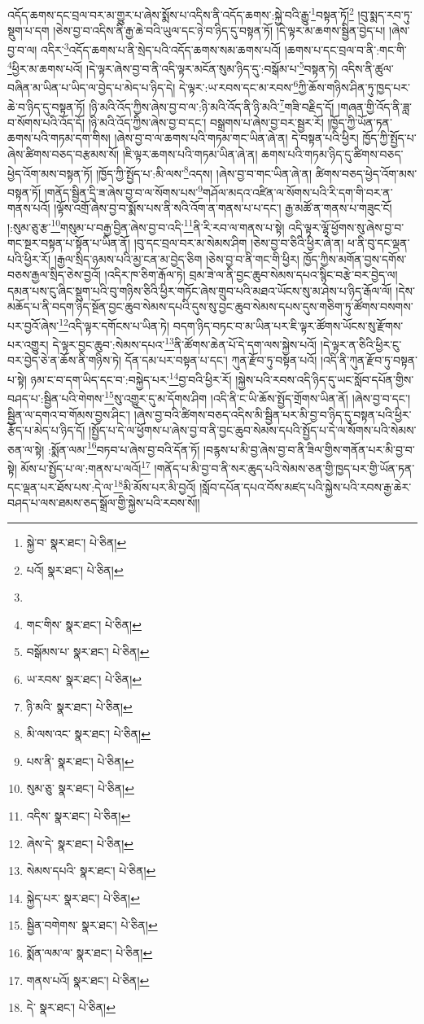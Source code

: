 འདོད་ཆགས་དང་བྲལ་བར་མ་གྱུར་པ་ཞེས་སྨོས་པ་འདིས་ནི་འདོད་ཆགས་:སྐྱེ་བའི་རྒྱུ་\footnote{སྐྱེ་བ་  སྣར་ཐང་།  པེ་ཅིན། }བསྟན་ཏོ།\footnote{པའོ།  སྣར་ཐང་།  པེ་ཅིན། } །བུ་སྨད་རབ་ཏུ་སྡུག་པ་དག །ཅེས་བྱ་བ་འདིས་ནི་རྒྱ་ཆེ་བའི་ཡུལ་དང་ཉེ་བ་ཉིད་དུ་བསྟན་ཏོ། །དེ་ལྟར་མ་ཆགས་སྦྱིན་བྱེད་པ། །ཞེས་བྱ་བ་ལ། འདིར་\footnote{}འདོད་ཆགས་པ་ནི་སྲེད་པའི་འདོད་ཆགས་སམ་ཆགས་པའོ། །ཆགས་པ་དང་བྲལ་བ་ནི་:གང་གི་\footnote{གང་གིས་  སྣར་ཐང་།  པེ་ཅིན། }ཕྱིར་མ་ཆགས་པའོ། །དེ་ལྟར་ཞེས་བྱ་བ་ནི་འདི་ལྟར་མངོན་སུམ་ཉིད་དུ་:བསྒོམ་པ་\footnote{བསྒོམས་པ་  སྣར་ཐང་།  པེ་ཅིན། }བསྟན་ཏེ། འདིས་ནི་ཚུལ་བཞིན་མ་ཡིན་པ་ཡིད་ལ་བྱེད་པ་མེད་པ་ཉིད་དེ། དེ་ལྟར་:ཡ་རབས་དང་མ་རབས་\footnote{ཡ་རབས་  སྣར་ཐང་།  པེ་ཅིན། }ཀྱི་ཆོས་གཉིས་ཤིན་ཏུ་ཁྱད་པར་ཆེ་བ་ཉིད་དུ་བསྟན་ཏོ། །ཉི་མའི་འོད་ཀྱིས་ཞེས་བྱ་བ་ལ་:ཉི་མའི་འོད་ནི་ཉི་མའི་\footnote{ཉི་མའི་  སྣར་ཐང་།  པེ་ཅིན། }གཟི་བརྗིད་དོ། །གཞན་གྱི་འོད་ནི་ཟླ་བ་སོགས་པའི་འོད་དོ། །ཉི་མའི་འོད་ཀྱིས་ཞེས་བྱ་བ་དང་། བསྒྲགས་པ་ཞེས་བྱ་བར་སྦྱར་རོ། །ཁྱོད་ཀྱི་ཡོན་ཏན་ཆགས་པའི་གཏམ་དག་གིས། །ཞེས་བྱ་བ་ལ་ཆགས་པའི་གཏམ་གང་ཡིན་ཞེ་ན། དེ་བསྟན་པའི་ཕྱིར། ཁྱོད་ཀྱི་སྤྱོད་པ་ཞེས་ཚིགས་བཅད་བརྩམས་སོ། །ཇི་ལྟར་ཆགས་པའི་གཏམ་ཡིན་ཞེ་ན། ཆགས་པའི་གཏམ་ཉིད་དུ་ཚིགས་བཅད་ཕྱེད་འོག་མས་བསྟན་ཏོ། །ཁྱོད་ཀྱི་སྤྱོད་པ་:མི་ལས་\footnote{མི་ལས་འང་  སྣར་ཐང་།  པེ་ཅིན། }འདས། །ཞེས་བྱ་བ་གང་ཡིན་ཞེ་ན། ཚིགས་བཅད་ཕྱེད་འོག་མས་བསྟན་ཏོ། །གནོད་སྦྱིན་དྲི་ཟ་ཞེས་བྱ་བ་ལ་སོགས་པས་\footnote{པས་ནི་  སྣར་ཐང་།  པེ་ཅིན། }གཤོལ་མདའ་འཛིན་ལ་སོགས་པའི་རི་དག་གི་བར་ན་གནས་པའོ། །ལྟོས་འགྲོ་ཞེས་བྱ་བ་སྨོས་པས་ནི་སའི་འོག་ན་གནས་པ་པ་དང་། རྒྱ་མཚོ་ན་གནས་པ་གཟུང་ངོ། །:སུམ་ཅུ་རྩ་\footnote{སུམ་ཅུ་  སྣར་ཐང་།  པེ་ཅིན། }གསུམ་པ་བརྒྱ་བྱིན་ཞེས་བྱ་བ་འདི་\footnote{འདིས་  སྣར་ཐང་།  པེ་ཅིན། }ནི་རི་རབ་ལ་གནས་པ་སྟེ། འདི་ལྟར་ལྷོ་ཕྱོགས་སུ་ཞེས་བྱ་བ་གང་སྔར་བསྟན་པ་སྟོན་པ་ཡིན་ནོ། །བུ་དང་བྲལ་བར་མ་སེམས་ཤིག །ཅེས་བྱ་བ་ཅིའི་ཕྱིར་ཞེ་ན། ཕ་ནི་བུ་དང་ལྡན་པའི་ཕྱིར་རོ། །རྒྱལ་སྲིད་ཉམས་པའི་མྱ་ངན་མ་བྱེད་ཅིག །ཅེས་བྱ་བ་ནི་གང་གི་ཕྱིར། ཁྱོད་ཀྱིས་མགོན་བྱས་དགོས་བཅས་རྒྱལ་སྲིད་ཅེས་བྱའོ། །འདིར་ཁ་ཅིག་རྒོལ་ཏེ། བྲམ་ཟེ་ལ་ནི་བྱང་ཆུབ་སེམས་དཔའ་སྙིང་བརྩེ་བར་བྱེད་ལ། དམན་པས་ངུ་ཞིང་སྡུག་པའི་བུ་གཉིས་ཅིའི་ཕྱིར་གཏོང་ཞེས་གྲུབ་པའི་མཐའ་ཡོངས་སུ་མ་ཤེས་པ་ཉིད་རྒོལ་ལོ། །དེས་མཆོད་པ་ནི་བདག་ཉིད་སྔོན་བྱང་ཆུབ་སེམས་དཔའི་དུས་སུ་བྱང་ཆུབ་སེམས་དཔས་དུས་གཅིག་ཏུ་ཚོགས་བསགས་པར་བྱའོ་ཞེས་\footnote{ཞེས་དེ་  སྣར་ཐང་།  པེ་ཅིན། }འདི་ལྟར་དགོངས་པ་ཡིན་ཏེ། བདག་ཉིད་བཏང་བ་མ་ཡིན་པར་ཇི་ལྟར་ཚོགས་ཡོངས་སུ་རྫོགས་པར་འགྱུར། དེ་ལྟར་བྱང་ཆུབ་:སེམས་དཔའ་\footnote{སེམས་དཔའི་  སྣར་ཐང་།  པེ་ཅིན། }ནི་ཚོགས་ཆེན་པོ་དེ་དག་ལས་སྐྱེས་པའོ། །དེ་ལྟར་ན་ཅིའི་ཕྱིར་ངུ་བར་བྱེད་ཅེ་ན་ཆོས་ནི་གཉིས་ཏེ། དོན་དམ་པར་བསྟན་པ་དང་། ཀུན་རྫོབ་ཏུ་བསྟན་པའོ། །འདི་ནི་ཀུན་རྫོབ་ཏུ་བསྟན་པ་སྟེ། ཉམ་ང་བ་དག་ཡིད་དང་བ་:བསྐྱེད་པར་\footnote{སྐྱེད་པར་  སྣར་ཐང་།  པེ་ཅིན། }བྱ་བའི་ཕྱིར་རོ། །སྐྱེས་པའི་རབས་འདི་ཉིད་དུ་ཡང་སློབ་དཔོན་གྱིས་བཤད་པ་:སྦྱིན་པའི་གེགས་\footnote{སྦྱིན་བགེགས་  སྣར་ཐང་།  པེ་ཅིན། }སུ་འགྱུར་དུ་མ་དོགས་ཤིག །འདི་ནི་ང་ཡི་ཆོས་སྤྱོད་གྲོགས་ཡིན་ནོ། །ཞེས་བྱ་བ་དང་། སྦྱིན་ལ་དགའ་བ་གོམས་བྱས་ཤིང་། །ཞེས་བྱ་བའི་ཚིགས་བཅད་འདིས་མི་སྦྱིན་པར་མི་བྱ་བ་ཉིད་དུ་བསྟན་པའི་ཕྱིར་རྩོད་པ་མེད་པ་ཉིད་དོ། །སྤྱོད་པ་དེ་ལ་ཕྱོགས་པ་ཞེས་བྱ་བ་ནི་བྱང་ཆུབ་སེམས་དཔའི་སྤྱོད་པ་དེ་ལ་སོགས་པའི་སེམས་ཅན་ལ་སྟེ། :སྨོན་ལམ་\footnote{སྨོན་ལམ་ལ་  སྣར་ཐང་།  པེ་ཅིན། }བཏབ་པ་ཞེས་བྱ་བའི་དོན་ཏོ། །བརྙས་པ་མི་བྱ་ཞེས་བྱ་བ་ནི་ཟིལ་གྱིས་གནོན་པར་མི་བྱ་བ་སྟེ། མོས་པ་སྤྱོད་པ་ལ་:གནས་པ་ལའོ།\footnote{གནས་པའོ།  སྣར་ཐང་།  པེ་ཅིན། } །གནོད་པ་མི་བྱ་བ་ནི་སར་ཆུད་པའི་སེམས་ཅན་གྱི་ཁྱད་པར་གྱི་ཡོན་ཏན་དང་ལྡན་པར་ཐོས་པས་:དེ་ལ་\footnote{དེ་  སྣར་ཐང་།  པེ་ཅིན། }མི་མོས་པར་མི་བྱའོ། །སློབ་དཔོན་དཔའ་བོས་མཛད་པའི་སྐྱེས་པའི་རབས་རྒྱ་ཆེར་བཤད་པ་ལས་ཐམས་ཅད་སྒྲོལ་གྱི་སྐྱེས་པའི་རབས་སོ།། 